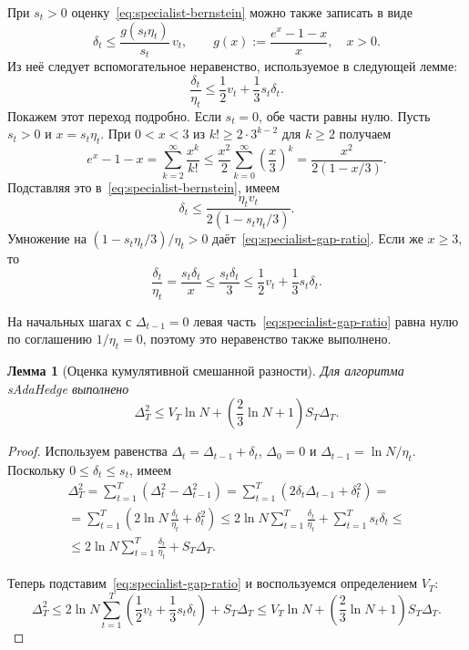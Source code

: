\documentclass[a4paper,12pt]{article}
\theoremstyle{plain}
\newtheorem*{lemma}{Лемма}
\theoremstyle{definition}
\theoremstyle{remark}
\numberwithin{equation}{section}
\begin{document}
При $s_t>0$ оценку~\eqref{eq:specialist-bernstein} можно также записать в виде
\[
\delta_t\leqslant\frac{g(s_t\eta_t)}{s_t}\,v_t,
\qquad
g(x):=\frac{e^x-1-x}{x},\quad x>0.
\]
Из неё следует вспомогательное неравенство, используемое в следующей лемме:
\begin{equation}
\label{eq:specialist-gap-ratio}
\frac{\delta_t}{\eta_t}
\leqslant\frac12 v_t+\frac13 s_t\delta_t.
\end{equation}
Покажем этот переход подробно. Если $s_t=0$, обе части равны нулю. Пусть $s_t>0$ и $x=s_t\eta_t$. При $0<x<3$ из $k!\geqslant2\cdot3^{k-2}$ для $k\geqslant2$ получаем
\[
e^x-1-x
=\sum_{k=2}^{\infty}\frac{x^k}{k!}
\leqslant\frac{x^2}{2}\sum_{k=0}^{\infty}\left(\frac{x}{3}\right)^k
=\frac{x^2}{2(1-x/3)}.
\]
Подставляя это в~\eqref{eq:specialist-bernstein}, имеем
\[
\delta_t\leqslant\frac{\eta_t v_t}{2(1-s_t\eta_t/3)}.
\]
Умножение на $(1-s_t\eta_t/3)/\eta_t>0$ даёт~\eqref{eq:specialist-gap-ratio}. Если же $x\geqslant3$, то
\[
\frac{\delta_t}{\eta_t}
=\frac{s_t\delta_t}{x}
\leqslant\frac{s_t\delta_t}{3}
\leqslant\frac12 v_t+\frac13 s_t\delta_t.
\]

На начальных шагах с $\Delta_{t-1}=0$ левая часть~\eqref{eq:specialist-gap-ratio} равна нулю по соглашению $1/\eta_t=0$, поэтому это неравенство также выполнено.

\begin{lemma}[Оценка кумулятивной смешанной разности]
Для алгоритма sAdaHedge выполнено
\begin{equation}
\label{eq:specialist-cumulative-gap}
\Delta_T^2
\leqslant V_T\ln N+
\left(\frac23\ln N+1\right)S_T\Delta_T.
\end{equation}
\end{lemma}

\begin{proof}
Используем равенства $\Delta_t=\Delta_{t-1}+\delta_t$, $\Delta_0=0$ и $\Delta_{t-1}=\ln N/\eta_t$. Поскольку $0\leqslant\delta_t\leqslant s_t$, имеем
\begin{multline*}
  \Delta_T^2
=\sum_{t=1}^{T}\left(\Delta_t^2-\Delta_{t-1}^2\right)
 =\sum_{t=1}^{T}\left(2\delta_t\Delta_{t-1}+\delta_t^2\right) =\\
=\sum_{t=1}^{T}\left(2\ln N\,\frac{\delta_t}{\eta_t}+\delta_t^2\right)
\leqslant2\ln N\sum_{t=1}^{T}\frac{\delta_t}{\eta_t}
 +\sum_{t=1}^{T}s_t\delta_t \leqslant\\
\leqslant2\ln N\sum_{t=1}^{T}\frac{\delta_t}{\eta_t}+S_T\Delta_T.
\end{multline*} 

Теперь подставим~\eqref{eq:specialist-gap-ratio} и воспользуемся определением $V_T$:
\[
\Delta_T^2
\leqslant2\ln N\sum_{t=1}^{T}
 \left(\frac12 v_t+\frac13 s_t\delta_t\right)+S_T\Delta_T
\leqslant V_T\ln N+
 \left(\frac23\ln N+1\right)S_T\Delta_T.
\]
\end{proof}
\end{document}
